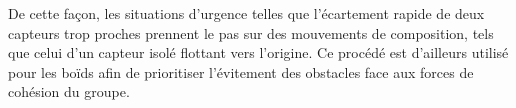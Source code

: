 \documentclass[10pt]{article}
\begin{document}
\begin{multicols}{2}
De cette façon, les situations d'urgence telles que l'écartement
rapide de deux capteurs trop proches prennent le pas sur des
mouvements de composition, tels que celui d'un capteur isolé flottant
vers l'origine. Ce procédé est d'ailleurs utilisé pour les boïds afin
de prioritiser l'évitement des obstacles face aux forces de cohésion
du groupe.

\end{multicols}

\begin{figure}[p]

  \centering

  \\
  \\

\end{figure}
\end{document}

